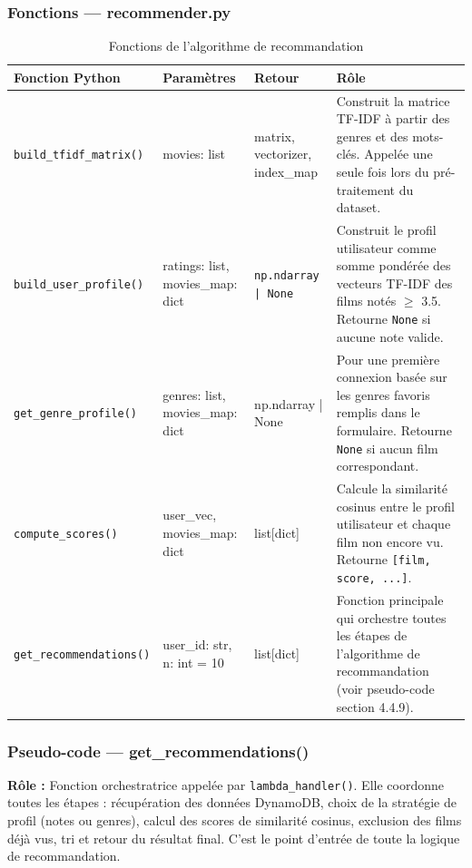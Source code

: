 \documentclass[a4paper,12pt]{report}
\begin{document}
\subsubsection{Fonctions — recommender.py}
\label{recom}
\begin{table}[htbp]
\centering
\begin{tabular}{lp{3cm}p{3cm}p{6cm}}
\toprule
\textbf{Fonction Python} & \textbf{Paramètres} & \textbf{Retour} & \textbf{Rôle} \\
\midrule

\texttt{build\_tfidf\_matrix()} & movies: list & matrix, vectorizer, index\_map & Construit la matrice TF-IDF à partir des genres et des mots-clés. Appelée une seule fois lors du pré-traitement du dataset. \\

\texttt{build\_user\_profile()} & ratings: list, movies\_map: dict & \texttt{np.ndarray | None} & Construit le profil utilisateur comme somme pondérée des vecteurs TF-IDF des films notés $\geq$ 3.5. Retourne \texttt{None} si aucune note valide. \\

\texttt{get\_genre\_profile()} & genres: list, movies\_map: dict & np.ndarray | None & Pour une première connexion basée sur les genres favoris remplis dans le formulaire. Retourne \texttt{None} si aucun film correspondant. \\

\texttt{compute\_scores()} & user\_vec, movies\_map: dict & list[dict] & Calcule la similarité cosinus entre le profil utilisateur et chaque film non encore vu. Retourne \texttt{[{film, score}, ...]}. \\

\texttt{get\_recommendations()} & user\_id: str, n: int = 10 & list[dict] & Fonction principale qui orchestre toutes les étapes de l'algorithme de recommandation (voir pseudo-code section 4.4.9). \\

\bottomrule
\end{tabular}
\caption{Fonctions de l'algorithme de recommandation}
\end{table}
\newpage
\subsubsection{Pseudo-code — get\_recommendations()}

\textbf{Rôle :} Fonction orchestratrice appelée par \texttt{lambda\_handler()}. 
Elle coordonne toutes les étapes : récupération des données DynamoDB, choix de la stratégie de profil (notes ou genres), calcul des scores de similarité cosinus, exclusion des films déjà vus, tri et retour du résultat final. 
C'est le point d'entrée de toute la logique de recommandation.
\end{document}

